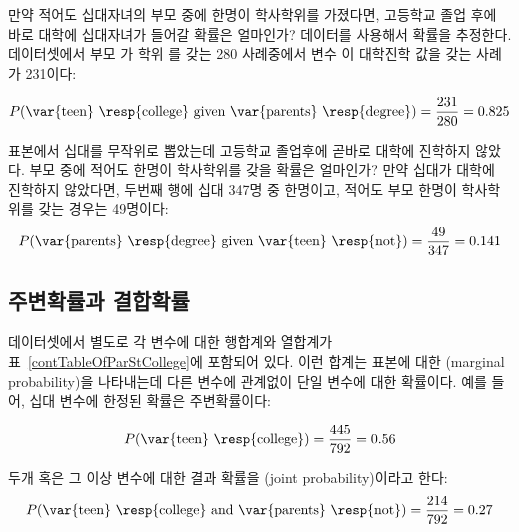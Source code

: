 \begin{example}{만약 적어도 십대자녀의 부모 중에 한명이 학사학위를 가졌다면, 고등학교 졸업 후에 바로 대학에 십대자녀가 들어갈 확률은 얼마인가?}
데이터를 사용해서 확률을 추정한다. 데이터셋에서 부모 가 학위 를 갖는 280 사례중에서 변수 이 대학진학  값을 갖는 사례가 231이다:

\begin{eqnarray*}
P(\text{\var{teen} \resp{college} given \var{parents} \resp{degree}}) = \frac{231}{280} = 0.825
\end{eqnarray*}
\end{example}

\begin{example}{표본에서 십대를 무작위로 뽑았는데 고등학교 졸업후에 곧바로 대학에 진학하지 않았다. 부모 중에 적어도 한명이 학사학위를 갖을 확률은 얼마인가?}\label{collegeProbOfParentsGivenStudentNot}
만약 십대가 대학에 진학하지 않았다면, 두번째 행에 십대 347명 중 한명이고, 적어도 부모 한명이 학사학위를 갖는 경우는 49명이다:
\begin{eqnarray*}
P(\text{\var{parents} \resp{degree} given \var{teen} \resp{not}}) = \frac{49}{347} = 0.141
\end{eqnarray*}
\end{example}

\subsection{주변확률과 결합확률}
\label{marginalAndJointProbabilities}


 데이터셋에서 별도로 각 변수에 대한 행합계와 열합계가 표~\ref{contTableOfParStCollege}에 포함되어 있다. 이런 합계는 표본에 대한 (marginal probability)을 나타내는데 다른 변수에 관계없이 단일 변수에 대한 확률이다. 예를 들어,  십대 변수에 한정된 확률은 주변확률이다: 

\begin{align*}
P(\text{\var{teen} \resp{college}}) = \frac{445}{792} = 0.56
\end{align*}

두개 혹은 그 이상 변수에 대한 결과 확률을 (joint probability)이라고 한다:
\begin{align*}
P(\text{\var{teen} \resp{college} and \var{parents} \resp{not}}) = \frac{214}{792} = 0.27
\end{align*}

